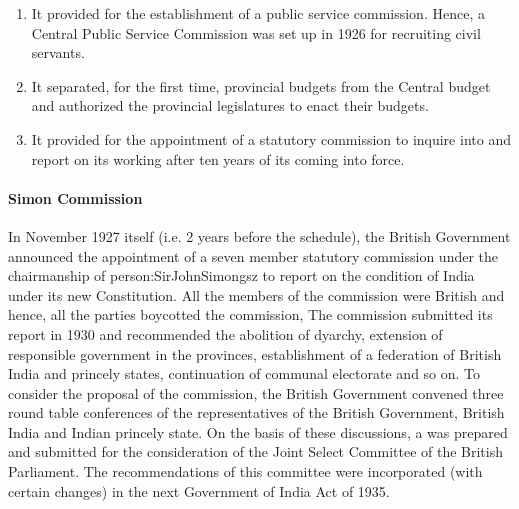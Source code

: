 \begin{enumerate}
  \item It provided for the establishment of a public service commission. Hence, a Central Public Service Commission was set up in 1926 for recruiting civil servants.
  \item It separated, for the first time, provincial budgets from the Central budget and authorized the provincial legislatures to enact their budgets.
  \item It provided for the appointment of a statutory commission to inquire into and report on its working after ten years of its coming into force.
\end{enumerate}

\paragraph{Simon Commission}

In November 1927 itself (i.e. 2 years before the schedule), the British Government announced the appointment of a seven member statutory commission under the chairmanship of \gls{person:SirJohnSimongsz} to report on the condition of India under its new Constitution. All the members of the commission were British and hence, all the parties boycotted the commission, The commission submitted its report in 1930 and recommended the abolition of dyarchy, extension of responsible government in the provinces, establishment of a federation of British India and princely states, continuation of communal electorate and so on. To consider the proposal of the commission, the British Government convened three round table conferences of the representatives of the British Government, British India and Indian princely state. On the basis of these discussions, a  was prepared and submitted for the consideration of the Joint Select Committee of the British Parliament. The recommendations of this committee were incorporated (with certain changes) in the next Government of India Act of 1935.


